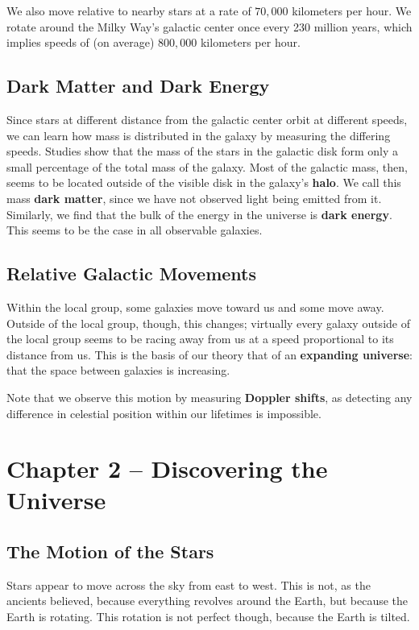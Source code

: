 \documentclass[12pt]{article}
\begin{document}
We also move relative to nearby stars at a rate of $70,000$ kilometers per hour. We rotate around the Milky Way's galactic center once every 230 million years, which implies speeds of (on average) $800,000$ kilometers per hour.

\subsection{Dark Matter and Dark Energy}
Since stars at different distance from the galactic center orbit at different speeds, we can learn how mass is distributed in the galaxy by measuring the differing speeds. Studies show that the mass of the stars in the galactic disk form only a small percentage of the total mass of the galaxy. Most of the galactic mass, then, seems to be located outside of the visible disk in the galaxy's {\bf halo}. We call this mass {\bf dark matter}, since we have not observed light being emitted from it. Similarly, we find that the bulk of the energy in the universe is {\bf dark energy}. This seems to be the case in all observable galaxies.

\subsection{Relative Galactic Movements}
Within the local group, some galaxies move toward us and some move away. Outside of the local group, though, this changes; virtually every galaxy outside of the local group seems to be racing away from us at a speed proportional to its distance from us. This is the basis of our theory that of an {\bf expanding universe}: that the space between galaxies is increasing.

Note that we observe this motion by measuring {\bf Doppler shifts}, as detecting any difference in celestial position within our lifetimes is impossible.

\section{Chapter 2 -- Discovering the Universe}
\subsection{The Motion of the Stars}
Stars appear to move across the sky from east to west. This is not, as the ancients believed, because everything revolves around the Earth, but because the Earth is rotating. This rotation is not perfect though, because the Earth is tilted.
\end{document}
